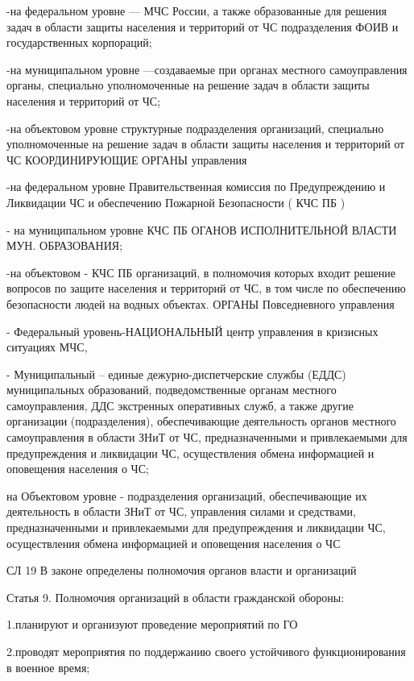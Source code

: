 \documentclass[a4paper, 12pt]{article}
\theoremstyle{definition}
\begin{document}
        -на федеральном уровне — МЧС России, а также образованные для решения задач в области защиты населения и территорий от ЧС подразделения ФОИВ и государственных корпораций;

        -на муниципальном уровне —создаваемые при органах местного самоуправления органы, специально уполномоченные на решение задач в области защиты населения и территорий от ЧС;
        
        -на объектовом уровне структурные подразделения организаций, специально уполномоченные на решение задач в области защиты населения и территорий от ЧС
        КООРДИНИРУЮЩИЕ ОРГАНЫ управления
        
        -на федеральном уровне Правительственная комиссия по Предупреждению и Ликвидации  ЧС и обеспечению Пожарной Безопасности ( КЧС  ПБ )
        
        -  на муниципальном уровне     КЧС  ПБ   ОГАНОВ ИСПОЛНИТЕЛЬНОЙ ВЛАСТИ МУН. ОБРАЗОВАНИЯ;
        
        -на объектовом - КЧС ПБ организаций, в полномочия которых входит решение вопросов по защите населения и территорий от ЧС, в том числе по обеспечению безопасности людей на водных объектах.
        ОРГАНЫ Повседневного управления
        
        - Федеральный уровень-НАЦИОНАЛЬНЫЙ центр управления в кризисных ситуациях МЧС,
        
        - Муниципальный -- единые дежурно-диспетчерские службы (ЕДДС) муниципальных образований, подведомственные органам местного самоуправления, ДДС экстренных оперативных служб, а также другие организации (подразделения), обеспечивающие деятельность органов местного самоуправления в области ЗНиТ от ЧС, предназначенными и привлекаемыми для предупреждения и ликвидации ЧС, осуществления обмена информацией и оповещения населения о ЧС;

        на Объектовом уровне - подразделения организаций, обеспечивающие их деятельность в области ЗНиТ от ЧС, управления силами и средствами, предназначенными и привлекаемыми для предупреждения и ликвидации ЧС, осуществления обмена информацией и оповещения населения о ЧС

        СЛ 19 В законе определены полномочия органов власти и организаций

        Статья 9. Полномочия организаций в области гражданской обороны:       

        1.планируют и организуют проведение мероприятий по ГО
        
        2.проводят мероприятия по поддержанию своего устойчивого функционирования в военное время;
        
\end{document}
